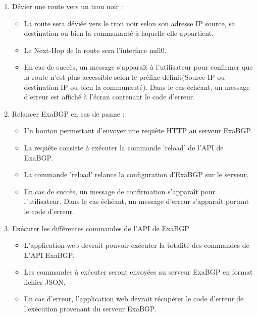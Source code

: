 \begin{enumerate}
\item Dévier une route vers un trou noir : 
	\begin{itemize}
		\item La route sera déviée vers le trou noir selon son adresse IP source, sa destination ou bien la communauté à laquelle elle appartient.
        \item Le Next-Hop de la route sera l'interface null0.
        \item En cas de succès, un message s’apparaît à l'utilisateur pour confirmer que la route n'est plus accessible selon le préfixe définit(Source IP ou destination IP ou bien la communauté). Dans le cas échéant, un message d'erreur est affiché à l'écran contenant le code d'erreur. 

	\end{itemize}

\item Relancer ExaBGP en cas de panne :
	\begin{itemize}
		\item Un bouton permettant d'envoyer une requête HTTP au serveur ExaBGP.
        \item La requête consiste à exécuter la commande 'reload' de l'API de ExaBGP.
        \item La commande 'reload' relance la configuration d'ExaBGP sur le serveur.
        \item En cas de succès, un message de confirmation s’apparaît pour l’utilisateur. Dans le cas échéant, un message d'erreur s’apparaît portant le code d'erreur.
	\end{itemize}

\item Exécuter les différentes commandes de l'API de ExaBGP
	\begin{itemize}
        \item L'application web devrait pouvoir exécuter la totalité des commandes de L'API ExaBGP.
        \item Les commandes à exécuter seront envoyées au serveur ExaBGP en format fichier JSON.
        \item En cas d'erreur, l'application web devrait récupérer le code d'erreur de l'exécution provenant du serveur ExaBGP.
	\end{itemize}	
\end{enumerate}

